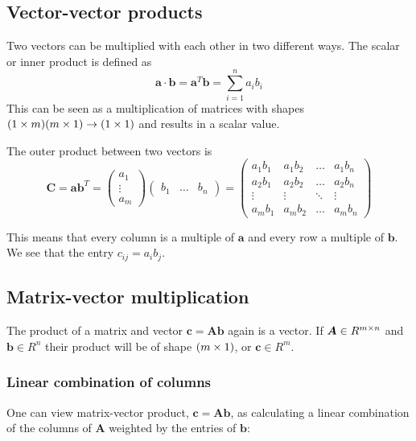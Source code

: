 \subsection{Vector-vector products}
Two vectors can be multiplied with each other in two different ways. 
The scalar or inner product is defined as 
\begin{equation}
    \bm{a} \cdot \bm{b} = \bm{a}^T \bm{b} = \sum_{i=1}^n a_i b_i 
\end{equation}
This can be seen as a multiplication of matrices with shapes $(1 \times m)(m \times 1) \rightarrow (1 \times 1)$ and results in a scalar value.

The outer product between two vectors is 
\begin{equation}
    \bm{C} = \bm{a}\bm{b}^T = \begin{pmatrix}
    a_{1} \\
    \vdots \\
    a_{m}
    \end{pmatrix}
    \begin{pmatrix}
        b_1 & \hdots & b_n
    \end{pmatrix} = 
    \begin{pmatrix}
        a_1 b_1 & a_1 b_2 & \hdots & a_1 b_n \\
        a_2 b_1 & a_2 b_2 & \hdots & a_2 b_n \\
        \vdots & \vdots   & \ddots & \vdots  \\
        a_m b_1 & a_m b_2 & \hdots & a_m b_n
    \end{pmatrix}
\end{equation}

This means that every column is a multiple of $\bm{a}$ and every row a multiple of $\bm{b}$. 
We see that the entry $c_{ij} = a_i b_j$.

\subsection{Matrix-vector multiplication}
The product of a matrix and vector $\bm{c} = \bm{A}\bm{b}$ again is a vector. 
If $\bm{A} \in R^{m \times n}$ and $\bm{b} \in R^n$ their product
will be of shape $(m \times 1)$, or $\bm{c} \in R^m$.

\subsubsection{Linear combination of columns}

One can view matrix-vector product, $\bm{c} = \bm{Ab}$, as calculating a linear combination of the columns of $\bm{A}$ weighted by 
the entries of $\bm{b}$:


